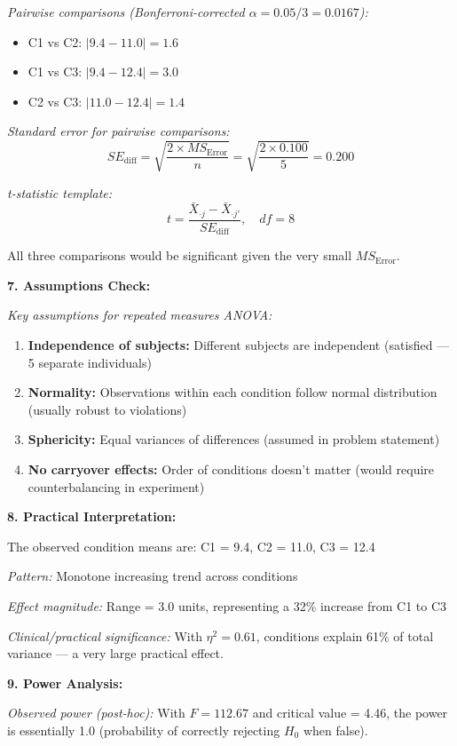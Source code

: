 \documentclass[12pt]{article}
\begin{document}
\begin{explanation}
\textit{Pairwise comparisons (Bonferroni-corrected $\alpha = 0.05/3 = 0.0167$):}

\begin{itemize}
\item C1 vs C2: $|9.4 - 11.0| = 1.6$
\item C1 vs C3: $|9.4 - 12.4| = 3.0$
\item C2 vs C3: $|11.0 - 12.4| = 1.4$
\end{itemize}

\textit{Standard error for pairwise comparisons:}
\[
SE_{\text{diff}} = \sqrt{\frac{2 \times MS_{\text{Error}}}{n}} = \sqrt{\frac{2 \times 0.100}{5}} = 0.200
\]

\textit{t-statistic template:}
\[
t = \frac{\bar{X}_{\cdot j} - \bar{X}_{\cdot j'}}{SE_{\text{diff}}}, \quad df = 8
\]

All three comparisons would be significant given the very small $MS_{\text{Error}}$.

\textbf{7. Assumptions Check:}

\textit{Key assumptions for repeated measures ANOVA:}

\begin{enumerate}
\item \textbf{Independence of subjects:} Different subjects are independent (satisfied — 5 separate individuals)
\item \textbf{Normality:} Observations within each condition follow normal distribution (usually robust to violations)
\item \textbf{Sphericity:} Equal variances of differences (assumed in problem statement)
\item \textbf{No carryover effects:} Order of conditions doesn't matter (would require counterbalancing in experiment)
\end{enumerate}

\textbf{8. Practical Interpretation:}

The observed condition means are: C1 = 9.4, C2 = 11.0, C3 = 12.4

\textit{Pattern:} Monotone increasing trend across conditions

\textit{Effect magnitude:} Range = 3.0 units, representing a 32\% increase from C1 to C3

\textit{Clinical/practical significance:} With $\eta^2 = 0.61$, conditions explain 61\% of total variance — a very large practical effect.

\textbf{9. Power Analysis:}

\textit{Observed power (post-hoc):} With $F = 112.67$ and critical value = 4.46, the power is essentially 1.0 (probability of correctly rejecting $H_0$ when false).


\end{explanation}
\end{document}
